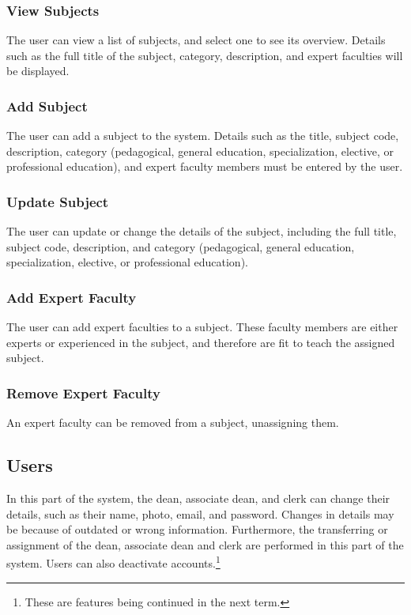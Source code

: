         \subsubsection{View Subjects}
        The user can view a list of subjects, and select one to see its overview. Details such as the full title of the subject, category, description, and expert faculties will be displayed.
        
        \subsubsection{Add Subject}
        The user can add a subject to the system. Details such as the title, subject code, description, category (pedagogical, general education, specialization, elective, or professional education), and expert faculty members must be entered by the user.
        
        \subsubsection{Update Subject}
        The user can update or change the details of the subject, including the full title, subject code, description, and category (pedagogical, general education, specialization, elective, or professional education).
        
        \subsubsection{Add Expert Faculty}
        The user can add expert faculties to a subject. These faculty members are either experts or experienced in the subject, and therefore are fit to teach the assigned subject.
        
        \subsubsection{Remove Expert Faculty}
        An expert faculty can be removed from a subject, unassigning them.
    
    \subsection{Users}
    In this part of the system, the dean, associate dean, and clerk can change their details, such as their name, photo, email, and password. Changes in details may be because of outdated or wrong information. Furthermore, the transferring or assignment of the dean, associate dean and clerk are performed in this part of the system. Users can also deactivate accounts.\footnote{These are features being continued in the next term.}
    
